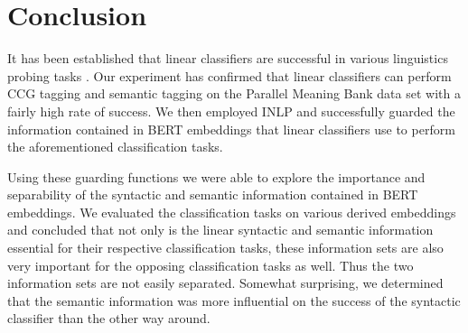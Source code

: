 \documentclass[11pt,a4paper]{article}
\begin{document}
        



\section{Conclusion}
\label{sec:conclusion}
It has been established that linear classifiers are successful in various linguistics probing tasks \citep{language-transfer}. Our experiment has confirmed that linear classifiers can perform CCG tagging and semantic tagging on the Parallel Meaning Bank data set \citep{pmbData} with a fairly high rate of success. We then employed INLP and successfully guarded the information contained in BERT embeddings that linear classifiers use to perform the aforementioned classification tasks. 

Using these guarding functions we were able to explore the importance and separability of the syntactic and semantic information contained in BERT embeddings. We evaluated the classification tasks on various derived embeddings and concluded that not only is the linear syntactic and semantic information essential for their respective classification tasks, these information sets are also very important for the opposing classification tasks as well. Thus the two information sets are not easily separated. Somewhat surprising, we determined that the semantic information was more influential on the success of the syntactic classifier than the other way around. 


\end{document}
